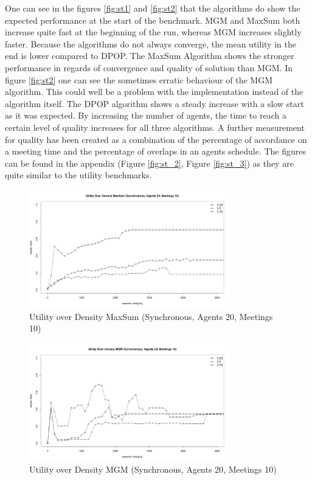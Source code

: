 One can see in the figures \ref{fig:st1} and \ref{fig:st2} that the algorithms do show the expected performance at the start of the benchmark. MGM and MaxSum both increase quite fast at the beginning of the run, whereas MGM increases slightly faster. Because the algorithms do not always converge, the mean utility in the end is lower compared to DPOP. The MaxSum Algorithm shows the stronger performance in regards of convergence and quality of solution than MGM. In figure \ref{fig:st2} one can see the sometimes erratic behaviour of the MGM algorithm. This could well be a problem with the implementation instead of the algorithm itself. The DPOP algorithm shows a steady increase with a slow start as it was expected. By increasing the number of agents, the time to reach a certain level of quality increases for all three algorithms. A further measurement for quality has been created as a combination of the percentage of accordance on a meeting time and the percentage of overlaps in an agents schedule. The figures can be found in the appendix (Figure \ref{fig:st_2}, Figure \ref{fig:st_3}) as they are quite similar to the utility benchmarks.
\begin{figure}[H]
\centering
\includegraphics[width=330px]{graphics/experiments/static/st_5}
\caption{Utility over Density MaxSum (Synchronous, Agents 20, Meetings 10)}
\label{fig:st_5}
\end{figure}
\begin{figure}[H]
\centering
\includegraphics[width=330px]{graphics/experiments/static/st_6}
\caption{Utility over Density MGM (Synchronous, Agents 20, Meetings 10)}
\label{fig:st_6}
\end{figure}
